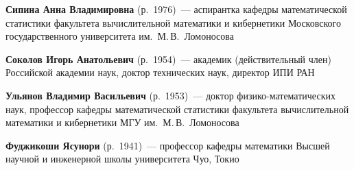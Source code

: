 \begin{multicols}{2}

\noindent
\textbf{Сипина Анна Владимировна} (р.\ 1976)~--- аспирантка кафедры математической статистики
факультета вычислительной математики 
и кибернетики Московского
государственного университета им.\ М.\,В.~Ломоносова


\noindent 
\textbf{Соколов Игорь Анатольевич} (р.\ 1954)~---
академик (действительный член) Российской академии наук,
доктор технических наук, директор ИПИ РАН


\noindent
\textbf{Ульянов Владимир Васильевич} (р.\ 1953)~--- доктор физико-математических наук, 
профессор кафедры математической статистики факультета вычислительной математики и кибернетики МГУ им.\ М.\,В.~Ломоносова 



\noindent
\textbf{Фуджикоши Ясунори} (р.\ 1941)~--- профессор ка\-фед\-ры математики Высшей научной и инженерной школы 
университета Чуо, Токио


\end{multicols}